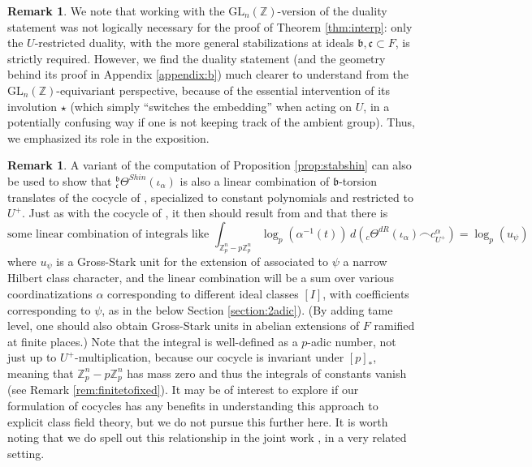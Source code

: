 \documentclass[10pt]{amsart}
\theoremstyle{definition}
\newtheorem{rem}[thm]{Remark}
\newcommand{\Z}{\mathbb{Z}}
\renewcommand{\c}{\mathfrak{c}}
\renewcommand{\b}{\mathfrak{b}}
\newcommand{\GL}{\mathrm{GL}}
\numberwithin{equation}{section}
\begin{document}
    \begin{rem}
        We note that working with the $\GL_n(\Z)$-version of the duality statement was not logically necessary for the proof of Theorem \ref{thm:interp}: only the $U$-restricted duality, with the more general stabilizations at ideals $\b,\c\subset F$, is strictly required. However, we find the duality statement (and the geometry behind its proof in Appendix \ref{appendix:b}) much clearer to understand from the $\GL_n(\Z)$-equivariant perspective, because of the essential intervention of its involution $\star$ (which simply ``switches the embedding'' when acting on $U$, in a potentially confusing way if one is not keeping track of the ambient group). Thus, we emphasized its role in the exposition.
    \end{rem}

    \begin{rem} \label{rem:grossstark}
        A variant of the computation of Proposition \ref{prop:stabshin} can also be used to show that ${}^\b_\c\Theta^{Shin}(\iota_\alpha)$ is also a linear combination of $\b$-torsion translates of the cocycle of \cite{CDG}, specialized to constant polynomials and restricted to $U^+$. Just as with the cocycle of \cite{CDG}, it then should result from \cite{DKSW} and \cite{DH} that there is
        \begin{equation} \label{eq:starkint}
        \text{some linear combination of integrals like }\int_{\Z_p^n-p\Z_p^n} \log_p(\alpha^{-1}(t))\, d({}_c\Theta^{dR}(\iota_\alpha) \frown c_{U^+}^\alpha) = \log_p(u_\psi) 
        \end{equation}
        where $u_\psi$ is a Gross-Stark unit for the extension of associated to $\psi$ a narrow Hilbert class character, and the linear combination will be a sum over various coordinatizations $\alpha$ corresponding to different ideal classes $[I]$, with coefficients corresponding to $\psi$, as in the below Section \ref{section:2adic}). (By adding tame level, one should also obtain Gross-Stark units in abelian extensions of $F$ ramified at finite places.) Note that the integral is well-defined as a $p$-adic number, not just up to $U^+$-multiplication, because our cocycle is invariant under $[p]_*$, meaning that $\Z_p^n-p\Z_p^n$ has mass zero and thus the integrals of constants vanish (see Remark \ref{rem:finitetofixed}). It may be of interest to explore if our formulation of cocycles has any benefits in understanding this approach to explicit class field theory, but we do not pursue this further here. It is worth noting that we do spell out this relationship in the joint work \cite{RX2}, in a very related setting.
    \end{rem}
    
\end{document}
